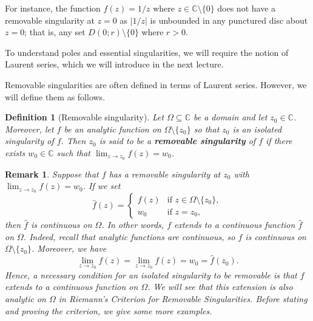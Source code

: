 \documentclass[10pt]{article}
\newcommand{\C}{\mathbb{C}}
\theoremstyle{newstyle}
\newtheorem{remark}[thm]{Remark}
\newtheorem{defn}[thm]{Definition}
\begin{document}
For instance, the function $f(z) = 1/z$ where $z \in \C \setminus \{0\}$ does not have a removable
singularity at $z = 0$ as $|1/z|$ is unbounded in any punctured disc about $z=0$; that is, any set 
$D(0; r) \setminus \{0\}$ where $r > 0$. 

To understand poles and essential singularities, we will require the notion of Laurent series, 
which we will introduce in the next lecture. 

Removable singularities are often defined in terms of Laurent series. However, we will define them 
as follows. 

\begin{defn}[Removable singularity]
Let $\Omega \subseteq \C$ be a domain and let $z_0 \in \C$. Moreover, let $f$ be an analytic function on 
$\Omega \setminus \{z_0\}$ so that $z_0$ is an isolated singularity of $f$. Then $z_0$ is said to be a 
{\bf removable singularity} of $f$ if there exists $w_0 \in \C$ such that $\lim_{z\to z_0} f(z) = w_0$. 
\end{defn}

\begin{remark}
Suppose that $f$ has a removable singularity at $z_0$ with $\lim_{z\to z_0} f(z) = w_0$. If we set 
\[ \hat f(z) = \begin{cases} f(z) & \text{if } z \in \Omega \setminus \{z_0\}, \\ 
w_0 & \text{if } z = z_0, \end{cases} \]
then $\hat f$ is continuous on $\Omega$. In other words, $f$ extends to a continuous function 
$\hat f$ on $\Omega$. Indeed, recall that analytic functions are continuous, so $f$ is continuous 
on $\Omega \setminus \{z_0\}$. Moreover, we have 
\[ \lim_{z\to z_0} \hat f(z) = \lim_{z\to z_0} f(z) = w_0 = \hat f(z_0). \]
Hence, a necessary condition for an isolated singularity to be removable is that $f$ extends to 
a continuous function on $\Omega$. We will see that this extension is also analytic on 
$\Omega$ in Riemann's Criterion for Removable Singularities. Before stating and proving the 
criterion, we give some more examples. 
\end{remark}
\end{document}
